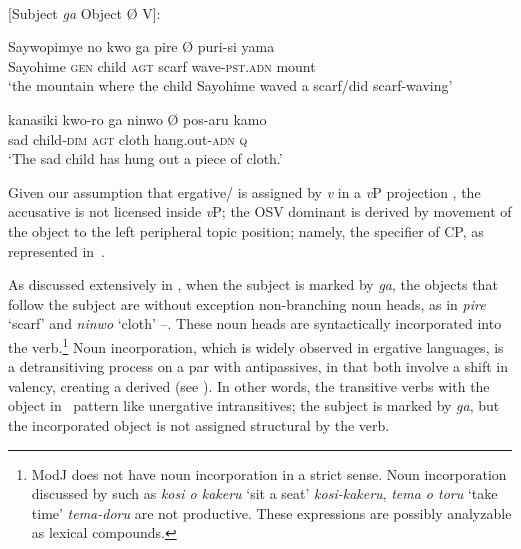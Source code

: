 \documentclass[output=paper]{LSP/langsci}
\begin{document}
\begin{exe}
\ex {}\\%
\label{14-ya-ex:12}
[Subject \textit{ga} Object Ø V]:
\begin{xlist}
\ex
\label{14-ya-ex:12a}
\gll Saywopimye no kwo ga pire Ø puri-si yama\\ %
Sayohime \textsc{gen} child \textsc{agt} scarf {} wave-\textsc{pst}.\textsc{adn} mount\\
\glt ‘the mountain where the child Sayohime waved a scarf/did scarf-waving’

\ex
\label{14-ya-ex:12b}
\gll kanasiki kwo-ro ga ninwo Ø pos-aru kamo\\ %
sad child-\textsc{dim} \textsc{agt} cloth {} hang.out-\textsc{adn} \textsc{q}\\
\glt ‘The sad child has hung out a piece of cloth.’ 
\end{xlist}
\end{exe}

Given our assumption that ergative/ is assigned by \textit{v} in a \textit{v}P projection , the accusative is not licensed inside \textit{v}P; the OSV dominant  is derived by movement of the object to the left peripheral topic position; namely, the specifier of CP, as represented in~.

As discussed extensively in \citet{Yanagidaetal2009Word}, when the subject is marked by \textit{ga}, the objects that follow the subject are without exception non-branching noun heads, as in \textit{pire} ‘scarf’ and \textit{ninwo} ‘cloth’ --. These noun heads are syntactically incorporated into the verb.\footnote{ModJ does not have noun incorporation in a strict sense. Noun incorporation discussed by \citet{Kageyama1980Goi} such as \textit{kosi o kakeru} ‘sit a seat’ \vs \textit{kosi-kakeru}, \textit{tema o toru} ‘take time’ \vs \textit{tema-doru} are not productive. These expressions are possibly analyzable as lexical compounds.} Noun incorporation, which is widely observed in ergative languages, is a detransitiving process on a par with antipassives, in that both involve a shift in valency, creating a derived  (see \citealt{Baker1988Incorporation}). In other words, the transitive verbs with the object in~ pattern like unergative intransitives; the subject is marked by \textit{ga}, but the incorporated object is not assigned structural  by the verb. 
\end{document}
